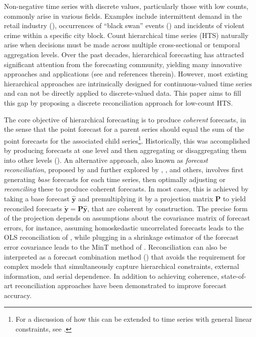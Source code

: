 \documentclass[a4paper,review,12pt,authoryear]{elsarticle}
\theoremstyle{definition}
\begin{document}
Non-negative time series with discrete values, particularly those with low counts, commonly arise in various fields.
Examples include intermittent demand in the retail industry (\citealp{kourentzesElucidateStructureIntermittent2021}), occurrences of ``black swan'' events (\citealp{nikolopoulosWeNeedTalk2020}) and incidents of violent crime within a specific city block.
Count hierarchical time series (HTS) naturally arise when decisions must be made across multiple cross-sectional or temporal aggregation levels. Over the past decades, hierarchical forecasting has attracted significant attention from the forecasting community, yielding many innovative approaches and applications (see \citealp{athanasopoulosForecastReconciliationReview2023} and references therein). However, most existing hierarchical approaches are intrinsically designed for continuous-valued time series and can not be directly applied to discrete-valued data. This paper aims to fill this gap by proposing a discrete reconciliation approach for low-count HTS.

The core objective of hierarchical forecasting is to produce \textit{coherent} forecasts,
in the sense that the point forecast for a parent series should equal the sum of the point forecasts for the associated child series\footnote{For a discussion of how this can be extended to time series with general linear constraints, see \cite{girolimetto2023point}.}. Historically, this was accomplished by producing forecasts at one level
and then aggregating or disaggregating them into other levels (\citealp{fliednerHierarchicalForecastingIssues2001}).
An alternative approach, also known as \textit{forecast reconciliation}, proposed by \cite{hyndmanOptimalCombinationForecasts2011} and further explored by \cite{wickramasuriyaOptimalForecastReconciliation2019}, \cite{panagiotelisForecastReconciliationGeometric2021}, and others, involves first generating \textit{base} forecasts for each time series,
then optimally adjusting or \textit{reconciling} these to produce coherent forecasts. In most cases, this is achieved by taking a base forecast $\hat{\bm{y}}$ and premultiplying it by a projection matrix $\mathbf{P}$ to yield reconciled forecasts $\tilde{\bm{y}}=\mathbf{P}\hat{\bm{y}}$, that are coherent by construction. The precise form of the projection depends on assumptions about the covariance matrix of forecast errors, for instance, assuming homoskedastic uncorrelated forecasts leads to the OLS reconciliation of \cite{hyndmanOptimalCombinationForecasts2011}, while plugging in a shrinkage estimator of the forecast error covariance leads to the MinT method of \cite{wickramasuriyaOptimalForecastReconciliation2019}. Reconciliation can also be interpreted as a forecast combination method (\citealp{hollymanUnderstandingForecastReconciliation2021}) that avoids the requirement for complex models that simultaneously capture hierarchical constraints, external information, and serial dependence. In addition to achieving coherence, state-of-art reconciliation approaches have been demonstrated to improve forecast accuracy.
\end{document}
